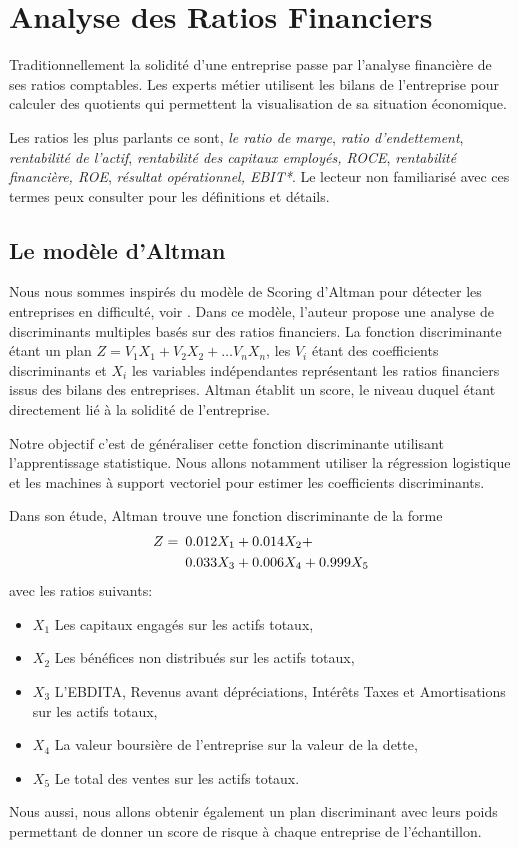 \documentclass[DIV=calc, paper=a4, fontsize=11pt, twocolumn]{scrartcl}
\begin{document}
\section{Analyse des Ratios Financiers}
Traditionnellement la solidité d'une entreprise passe par l'analyse financière de ses ratios comptables. Les experts métier utilisent les bilans de l'entreprise pour calculer des quotients qui permettent la visualisation de sa situation économique. 

Les ratios les plus parlants ce sont, \emph{le ratio de marge}, \emph{ratio d'endettement}, \emph{rentabilité de l'actif}, \emph{rentabilité des capitaux employés, ROCE}, \emph{rentabilité financière, ROE}, \emph{résultat opérationnel, EBIT*}. Le lecteur non familiarisé avec ces termes peux consulter \cite{Thibierge} pour les définitions et détails.
\subsection{Le modèle d'Altman}
Nous nous sommes inspirés du modèle de Scoring d'Altman pour détecter les entreprises en difficulté, voir \cite{Altman}. Dans ce modèle, l'auteur propose une analyse de discriminants multiples basés sur des ratios financiers. La fonction discriminante étant un plan $Z = V_1X_1 + V_2X_2 + \ldots V_nX_n$, les $V_i$ étant des coefficients discriminants et $X_i$ les variables indépendantes représentant les ratios financiers issus des bilans des entreprises. Altman établit un score, le niveau duquel étant directement lié à la solidité de l'entreprise.

Notre objectif c'est de généraliser cette fonction discriminante utilisant l'apprentissage statistique. Nous allons notamment utiliser la régression logistique et les machines à support vectoriel pour estimer les coefficients discriminants. 

Dans son étude, Altman trouve une fonction discriminante de la forme
\begin{align*}
Z =& \enskip 0.012X_1  + 0.014X_2 + \\
  & \enskip 0.033X_3 +   0.006X_4 +  0.999X_5\\
\end{align*}
avec les ratios suivants:
\begin{itemize}
  \item[] $X_1$ Les capitaux engagés sur les actifs totaux,
  \item[] $X_2$ Les bénéfices non distribués sur les actifs totaux,
  \item[] $X_3$ L'EBDITA, Revenus avant dépréciations, Intérêts Taxes et Amortisations sur les actifs totaux,
  \item[] $X_4$ La valeur boursière de l'entreprise sur la valeur de la dette,
  \item[] $X_5$ Le total des ventes sur les actifs totaux.
\end{itemize}
Nous aussi, nous allons obtenir également un plan discriminant avec leurs poids permettant de donner un score de risque à chaque entreprise de l'échantillon.
\end{document}
